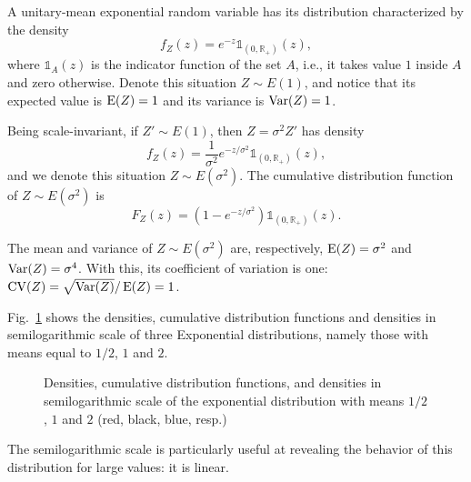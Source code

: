 A unitary-mean exponential random variable has its distribution characterized by the density
\begin{equation}
f_Z(z) = e^{-z} \mathbb 1_{(0,\mathbb R_+)}(z),
\end{equation}
where $\mathbb 1_{A}(z)$ is the indicator function of the set $A$, i.e., it takes value $1$ inside $A$ and zero otherwise.
Denote this situation $Z\sim E(1)$, and notice that its expected value is $\operatorname{E}(Z)=1$ and its variance is $\operatorname{Var}(Z)=1$.

Being scale-invariant, if $Z'\sim E(1)$, then $Z=\sigma^2 Z'$ has density
\begin{equation}
f_Z(z) = \frac{1}{\sigma^2}e^{-z/\sigma^2} \mathbb 1_{(0,\mathbb R_+)}(z),
\end{equation}
and we denote this situation $Z\sim E(\sigma^2)$.
The cumulative distribution function of $Z\sim E(\sigma^2)$ is 
\begin{equation}
F_Z(z) = (1-e^{-z/\sigma^2}) \mathbb 1_{(0,\mathbb R_+)}(z).
\end{equation}

The mean and variance of $Z\sim E(\sigma^2)$ are, respectively, $\operatorname{E}(Z)=\sigma^2$ and $\operatorname{Var}(Z) = \sigma^4$.
With this, its coefficient of variation is one: $\operatorname{CV}(Z) = \sqrt{\operatorname{Var}(Z)}/\operatorname{E}(Z) = 1$.

Fig.~\ref{Fig:ExponentialDistribution} shows the densities, cumulative distribution functions and densities in semilogarithmic scale of three Exponential distributions, namely those with means equal to $1/2$, $1$ and $2$.

\begin{figure}[hbt]
\centering
{}
\caption{Densities, cumulative distribution functions, and densities in semilogarithmic scale of the exponential distribution with means $1/2$, $1$ and $2$ (red, black, blue, resp.)}\label{Fig:ExponentialDistribution}
\end{figure}

The semilogarithmic scale is particularly useful at revealing the behavior of this distribution for large values: it is linear.


